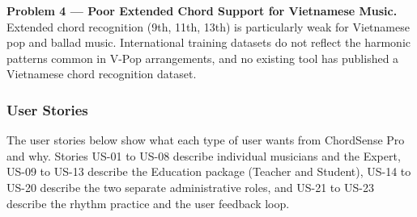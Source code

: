 \documentclass[a4paper]{article}
\begin{document}
\textbf{Problem 4 --- Poor Extended Chord Support for Vietnamese Music.} Extended chord recognition (9th, 11th, 13th) is particularly weak for Vietnamese pop and ballad music. International training datasets do not reflect the harmonic patterns common in V-Pop arrangements, and no existing tool has published a Vietnamese chord recognition dataset.

\subsubsection{User Stories}

The user stories below show what each type of user wants from ChordSense Pro and why. Stories US-01 to US-08 describe individual musicians and the Expert, US-09 to US-13 describe the Education package (Teacher and Student), US-14 to US-20 describe the two separate administrative roles, and US-21 to US-23 describe the rhythm practice and the user feedback loop.
\end{document}
